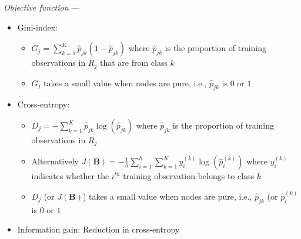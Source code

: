 \emph{Objective function} --- 
\begin{itemize}
    \item Gini-index:
    \begin{itemize}
        \item $G_j = \sum_{k=1}^K \hat{p}_{jk} (1 - \hat{p}_{jk})$
        where $\hat{p}_{jk}$ is the proportion of training observations in $R_j$ that are from class $k$
        \item $G_j$ takes a small value when nodes are pure, i.e., $\hat{p}_{jk}$ is $0$ or $1$
    \end{itemize}
    \item Cross-entropy:
    \begin{itemize}
        \item $D_j = -\sum_{k=1}^K \hat{p}_{jk} \log(\hat{p}_{jk})$
        where $\hat{p}_{jk}$ is the proportion of training observations in $R_j$
        \item Alternatively $J(\boldsymbol{B}) = -\frac{1}{h} \sum_{i=1}^h \sum_{k=1}^K y_i^{(k)} \log (\hat{p}_i^{(k)})$
        where $y_i^{(k)}$ indicates whether the $i^{th}$ training observation belongs to class $k$
        \item $D_j$ (or $J(\boldsymbol{B})$) takes a small value when nodes are pure, i.e., $\hat{p}_{jk}$ (or $\hat{p}_i^{(k)}$ is $0$ or $1$
    \end{itemize}
    \item Information gain: Reduction in cross-entropy
\end{itemize}